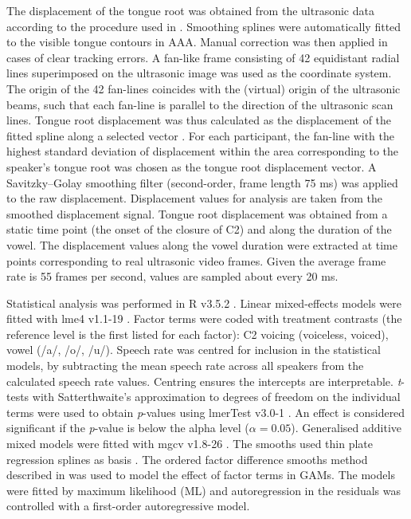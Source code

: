 \documentclass[12pt,]{article}
\begin{document}
The displacement of the tongue root was obtained from the ultrasonic
data according to the procedure used in \citet{kirkham2017}. Smoothing
splines were automatically fitted to the visible tongue contours in AAA.
Manual correction was then applied in cases of clear tracking errors. A
fan-like frame consisting of 42 equidistant radial lines superimposed on
the ultrasonic image was used as the coordinate system. The origin of
the 42 fan-lines coincides with the (virtual) origin of the ultrasonic
beams, such that each fan-line is parallel to the direction of the
ultrasonic scan lines. Tongue root displacement was thus calculated as
the displacement of the fitted spline along a selected vector
\citep{strycharczuk2015}. For each participant, the fan-line with the
highest standard deviation of displacement within the area corresponding
to the speaker's tongue root was chosen as the tongue root displacement
vector. A Savitzky--Golay smoothing filter (second-order, frame length
75 ms) was applied to the raw displacement. Displacement values for
analysis are taken from the smoothed displacement signal. Tongue root
displacement was obtained from a static time point (the onset of the
closure of C2) and along the duration of the vowel. The displacement
values along the vowel duration were extracted at time points
corresponding to real ultrasonic video frames. Given the average frame
rate is 55 frames per second, values are sampled about every 20 ms.

Statistical analysis was performed in R v3.5.2 \citep{r-core-team2018}.
Linear mixed-effects models were fitted with lme4 v1.1-19
\citep{bates2015}. Factor terms were coded with treatment contrasts (the
reference level is the first listed for each factor): C2 voicing
(voiceless, voiced), vowel (/a/, /o/, /u/). Speech rate was centred for
inclusion in the statistical models, by subtracting the mean speech rate
across all speakers from the calculated speech rate values. Centring
ensures the intercepts are interpretable. \emph{t}-tests with
Satterthwaite's approximation to degrees of freedom on the individual
terms were used to obtain \emph{p}-values using lmerTest v3.0-1
\citep{kuznetsova2017, luke2017}. An effect is considered significant if
the \emph{p}-value is below the alpha level (\(\alpha = 0.05\)).
Generalised additive mixed models were fitted with mgcv v1.8-26
\citep{wood2011, wood2017}. The smooths used thin plate regression
splines as basis \citep{wood2003}. The ordered factor difference smooths
method described in \citet{soskuthy2017, wieling2018} was used to model
the effect of factor terms in GAMs. The models were fitted by maximum
likelihood (ML) and autoregression in the residuals was controlled with
a first-order autoregressive model.
\end{document}
